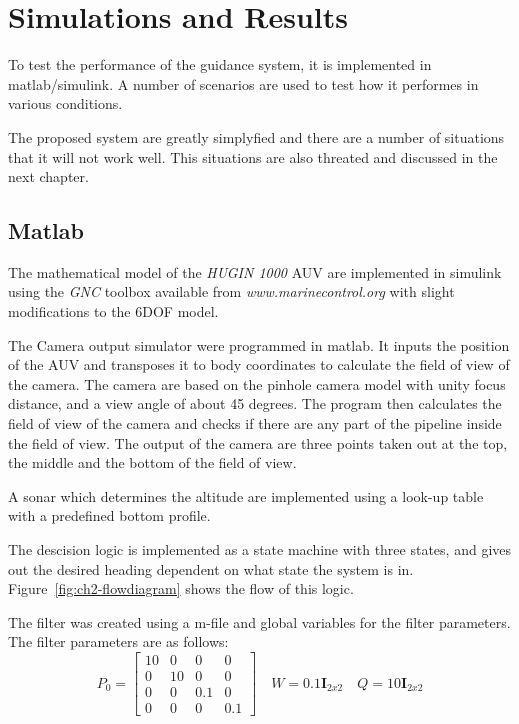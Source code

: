 \chapter{Simulations and Results}
	\label{ch3}
	To test the performance of the guidance system, it is implemented in matlab/simulink. A number of
	scenarios are used to test how it performes in various conditions.

	The proposed system are greatly simplyfied and there are a number of situations that it will not work
	well. This situations are also threated and discussed in the next chapter. 
	

\section{Matlab}
	The mathematical model of the \textit{HUGIN 1000} AUV are implemented in simulink using the
	\textit{GNC} toolbox available from \textit{www.marinecontrol.org} with slight modifications to the
	6DOF model.

	The Camera output simulator were programmed in matlab. It inputs the position of the AUV and
	transposes it to body coordinates to calculate the field of view of the camera. The camera are based
	on the pinhole camera model with unity focus distance, and a view angle of about 45 degrees. The
	program then calculates the field of view of the camera and checks if there are any part of the
	pipeline inside the field of view. The output of the camera are three points taken out at the top, the
	middle and the bottom of the field of view.

	A sonar which determines the altitude are implemented using a look-up table with a predefined bottom
	profile.

	The descision logic is implemented as a state machine with three states, and gives out the 
	desired heading dependent on what state the system is in. Figure~\ref{fig:ch2-flowdiagram} shows the
	flow of this logic.

	The filter was created using a m-file and global variables for the filter parameters. The filter
	parameters are as follows:
	\begin{equation}
		P_0 = \left [ \begin{matrix}
				10 & 0 & 0 & 0 \\
				0 & 10 & 0 & 0 \\
				0 & 0 & 0.1 & 0 \\
				0 & 0 & 0 & 0.1
				\end{matrix} \right] \quad
		W = 0.1 \mathbf{I}_{2x2} \quad Q = 10 \mathbf{I}_{2x2} 
	\end{equation}

